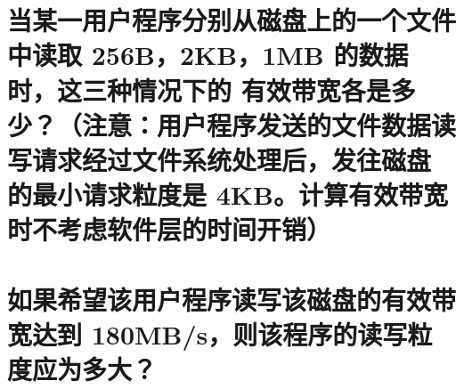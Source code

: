 
\begin{parts}
    \part {
        当某一用户程序分别从磁盘上的一个文件中读取 256B，2KB，1MB 的数据时，这三种情况下的
        有效带宽各是多少？（注意：用户程序发送的文件数据读写请求经过文件系统处理后，发往磁盘
        的最小请求粒度是 4KB。计算有效带宽时不考虑软件层的时间开销）
    }
    \part {
        如果希望该用户程序读写该磁盘的有效带宽达到 180MB/s，则该程序的读写粒度应为多大？
    }
\end{parts}

